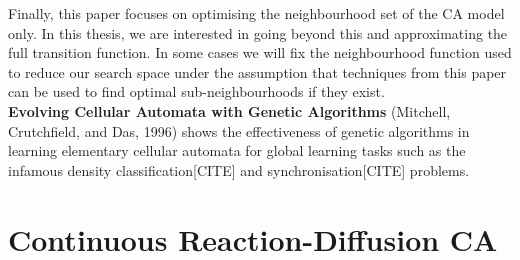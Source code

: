 Finally, this paper focuses on optimising the neighbourhood set of the CA model only. In this thesis, we are interested in going beyond this and approximating the full transition function. In some cases we will fix the neighbourhood function used to reduce our search space under the assumption that techniques from this paper can be used to find optimal sub-neighbourhoods if they exist.\\

\noindent
\textbf{Evolving Cellular Automata with Genetic Algorithms} (Mitchell, Crutchfield, and Das, 1996) \cite{mitchell1996evolving} shows the effectiveness of genetic algorithms in learning elementary cellular automata for global learning tasks such as the infamous density classification[CITE] and synchronisation[CITE] problems.\\


\section{Continuous Reaction-Diffusion CA}